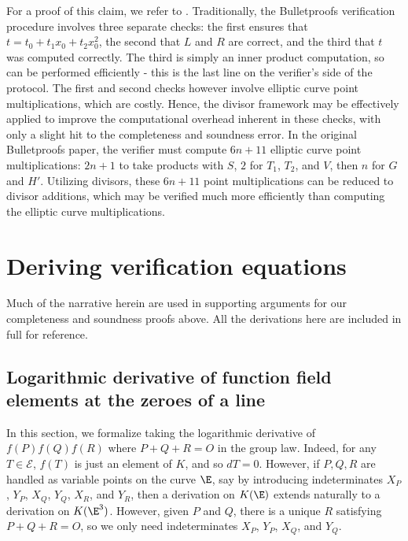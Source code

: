 \documentclass[11pt,letterpaper]{article}
\theoremstyle{definition}
\newcommand{\6}{\mathbf}
\newcommand{\7}{\mathcal}
\begin{document}
For a proof of this claim, we refer to \cite{Bullet}.
Traditionally, the Bulletproofs verification procedure involves three separate checks: the first ensures that $t = t_0 + t_1 x_0 + t_2 x_0^2$, the second that $L$ and $R$ are correct, and the third that $t$ was computed correctly.
The third is simply an inner product computation, so can be performed efficiently - this is the last line on the verifier's side of the protocol. 
The first and second checks however involve elliptic curve point multiplications, which are costly. 
Hence, the divisor framework may be effectively applied to improve the computational overhead inherent in these checks, with only a slight hit to the completeness and soundness error.
In the original Bulletproofs paper, the verifier must compute $6n+11$ elliptic curve point multiplications: $2n+1$ to take products with $S$, $2$ for $T_1$, $T_2$, and $V$, then $n$ for $G$ and $H'$.
Utilizing divisors, these $6n+11$ point multiplications can be reduced to divisor additions, which may be verified much more efficiently than computing the elliptic curve multiplications.



















\appendix

\section{Deriving verification equations}\label{sec:derivation}

Much of the narrative herein are used in supporting arguments for our completeness and soundness proofs above. All the derivations here are included in full for reference. 

\subsection{Logarithmic derivative of function field elements at the zeroes of a line}

In this section, we formalize taking the logarithmic derivative of $f(P)f(Q)f(R)$ where $P + Q + R = O$ in the group law. Indeed, for any $T \in \mathcal{E}$, $f(T)$ is just an element of $K$, and so $dT = 0$. However, if $P, Q, R$ are handled as variable points on the curve $\E$, say by introducing indeterminates $X_P$, $Y_P$, $X_Q$, $Y_Q$, $X_R$, and $Y_R$, then a derivation on $K(\E)$ extends naturally to a derivation on $K(\E^3)$. However, given $P$ and $Q$, there is a unique $R$ satisfying $P + Q + R = O$, so we only need indeterminates $X_P$, $Y_P$, $X_Q$, and $Y_Q$.
\end{document}
